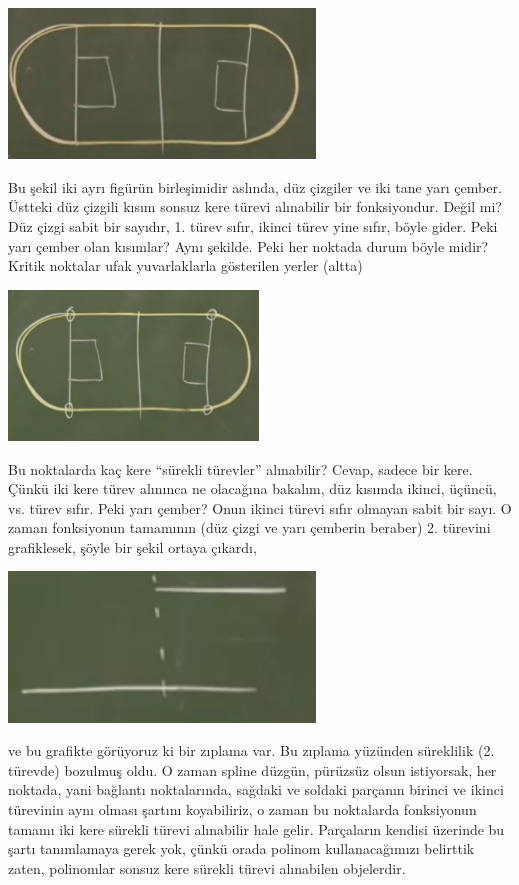 \documentclass[12pt,fleqn]{article}\usepackage{../../common}
\begin{document}
\includegraphics[height=4cm]{spline6.png}

Bu şekil iki ayrı figürün birleşimidir aslında, düz çizgiler ve iki tane
yarı çember. Üstteki düz çizgili kısım sonsuz kere türevi alınabilir bir
fonksiyondur. Değil mi? Düz çizgi sabit bir sayıdır, 1. türev sıfır, ikinci
türev yine sıfır, böyle gider. Peki yarı çember olan kısımlar? Aynı
şekilde. Peki her noktada durum böyle midir? Kritik noktalar ufak
yuvarlaklarla gösterilen yerler (altta)

\includegraphics[height=4cm]{spline7.png}

Bu noktalarda kaç kere ``sürekli türevler'' alınabilir? Cevap, sadece bir
kere. Çünkü iki kere türev alınınca ne olacağına bakalım, düz kısımda
ikinci, üçüncü, vs. türev sıfır. Peki yarı çember? Onun ikinci türevi sıfır
olmayan sabit bir sayı. O zaman fonksiyonun tamamının (düz çizgi ve yarı
çemberin beraber) 2. türevini grafiklesek, şöyle bir şekil ortaya çıkardı,

\includegraphics[height=4cm]{spline8.png}

ve bu grafikte görüyoruz ki bir zıplama var. Bu zıplama yüzünden süreklilik
(2. türevde) bozulmuş oldu. O zaman spline düzgün, pürüzsüz olsun istiyorsak, her noktada, yani
bağlantı noktalarında, sağdaki ve soldaki parçanın birinci ve ikinci
türevinin aynı olması şartını koyabiliriz, o zaman bu noktalarda
fonksiyonun tamamı iki kere sürekli türevi alınabilir hale
gelir. Parçaların kendisi üzerinde bu şartı tanımlamaya gerek yok, çünkü
orada polinom kullanacağımızı belirttik zaten, polinomlar sonsuz kere
sürekli türevi alınabilen objelerdir. 
\end{document}
